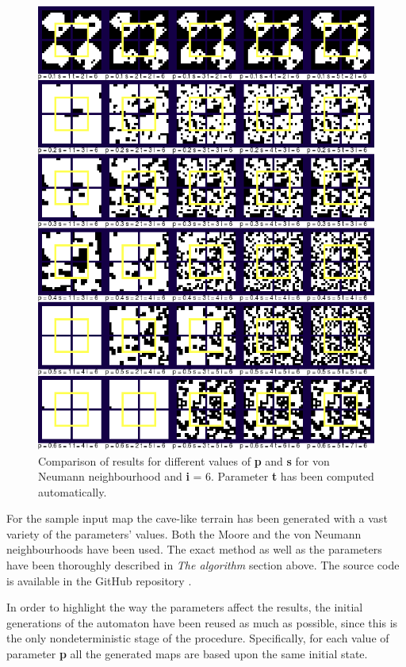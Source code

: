 \documentclass[a4paper, 11pt]{article} %
\begin{document}
\begin{figure}[ht]
        \centering
        \includegraphics[width=1.\textwidth]{neumann_sp}
	\caption{Comparison of results for different values of \textbf{p} and \textbf{s} for von Neumann neighbourhood and \textbf{i} = 6. Parameter \textbf{t} has been computed automatically.}
	\label{fig:results4}
\end{figure}

For the sample input map the cave-like terrain has been generated with a vast variety of the parameters' values. Both the Moore and the von Neumann neighbourhoods have been used. The exact method as well as the parameters have been thoroughly described in \emph{The algorithm} section above. The source code is available in the GitHub repository \cite{repo}.

In order to highlight the way the parameters affect the results, the initial generations of the automaton have been reused as much as possible, since this is the only nondeterministic stage of the procedure. Specifically, for each value of parameter \textbf{p} all the generated maps are based upon the same initial state.
\end{document}
